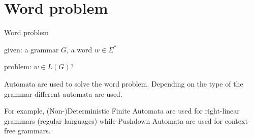 \documentclass{beamer}
\def\padding{\vspace{0.5cm}}
\begin{document}
\section{Word problem}

\begin{frame}{Word problem}
    \begin{definition}
        given: a grammar $G$, a word $w \in \Sigma^*$\par
        problem: $w \in L(G)$?
    \end{definition}\pause\padding
    Automata are used to solve the word problem. Depending on the type of the grammar different automata are used.\par
    For example, (Non-)Deterministic Finite Automata are used for right-linear grammars (regular languages) while Pushdown Automata are used for context-free grammars.
\end{frame}
\end{document}

